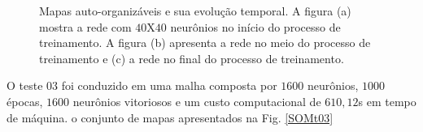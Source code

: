 \begin{figure}[H]
	\centering
	\qquad
	\qquad
	\qquad
	\caption{Mapas auto-organizáveis e sua evolução temporal. A figura (a) mostra a rede com $40$X$40$ neurônios no início do processo de treinamento. A figura (b) apresenta a rede no meio do processo de treinamento e (c) a rede no final do processo de treinamento.}
	\label{SOMt02}
\end{figure}

O teste $03$ foi conduzido em uma malha composta por $1600$ neurônios, $1000$ épocas, $1600$ neurônios vitoriosos e um custo computacional de $610,12$s em tempo de máquina. o conjunto de mapas apresentados na Fig. \ref{SOMt03}

